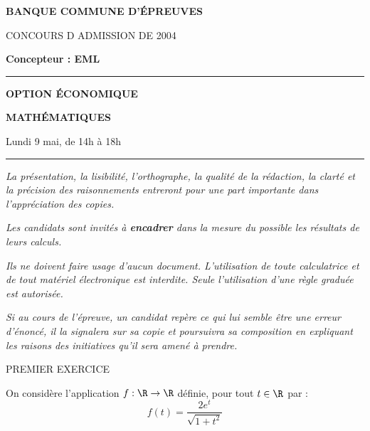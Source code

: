 \documentclass[11pt]{article}%
\begin{document}

\begin{center}
{\LARG\E\textbf{BANQUE COMMUNE D'ÉPREUVES}}



{\large \textsc{CONCOURS D ADMISSION DE 2004}}



{\large \textbf{Concepteur : EML}}



\rule{2.39cm}{0.05cm}



{\Large \textbf{OPTION ÉCONOMIQUE}}



{\Large \textbf{MATHÉMATIQUES }}



{\Large Lundi 9 mai, de 14h à 18h}



\rule{2.39cm}{0.05cm}
\end{center}

\textit{La présentation, la lisibilité, l'orthographe, la qualité
de la rédaction, la clarté et la précision des raisonnements
entreront pour une part importante dans l'appréciation des copies.}

\textit{Les candidats sont invités à \textbf{encadrer} dans la mesure
du possible les résultats de leurs calculs.}

\textit{Ils ne doivent faire usage d'aucun document. L'utilisation de
toute
calculatrice et de tout matériel électronique est interdite. Seule
l'utilisation d'une règle graduée est autorisée.}

\textit{Si au cours de l'épreuve, un candidat repère ce qui lui semble
être une erreur d'énoncé, il la signalera sur sa copie et
poursuivra sa composition en expliquant les raisons des initiatives
qu'il sera
amené à prendre.}

\vspace*{3cm}


\begin{center}
{\Huge \vspace{1cm} {\LARGE PREMIER EXERCICE} }
\end{center}

On considère l'application $f :\R\rightarrow \R$ définie, pour tout
$t\in \R$ par : 
\[
f\left( t\right) = \frac{2e^{t}}{\sqrt{1 + t^{2}}} 
\]
\end{document}
